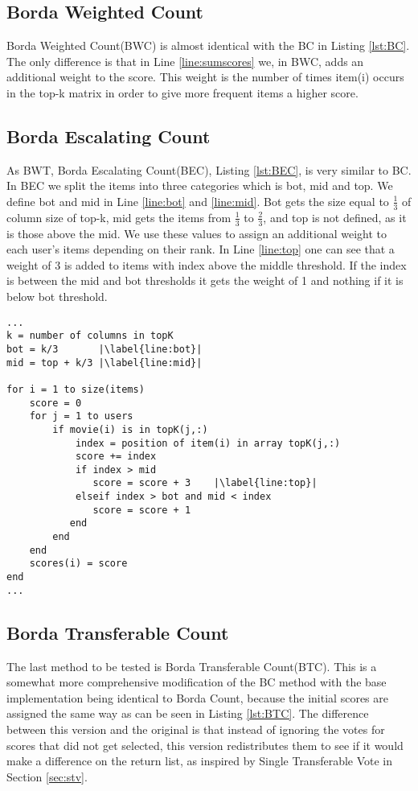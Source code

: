 \subsection{Borda Weighted Count}
Borda Weighted Count(BWC) is almost identical with the BC in Listing \ref{lst:BC}. The only difference is that in Line \ref{line:sumscores} we, in BWC, adds an additional weight to the score. This weight is the number of times item(i) occurs in the top-k matrix in order to give more frequent items a higher score.

\subsection{Borda Escalating Count}
As BWT, Borda Escalating Count(BEC), Listing \ref{lst:BEC}, is very similar to BC. In BEC we split the items into three categories which is bot, mid and top. We define bot and mid in Line \ref{line:bot} and \ref{line:mid}. Bot gets the size equal to $\frac{1}{3}$ of column size of top-k, mid gets the items from $\frac{1}{3}$ to $\frac{2}{3}$, and top is not defined, as it is those above the mid. We use these values to assign an additional weight to each user's items depending on their rank. In Line \ref{line:top} one can see that a weight of 3 is added to items with index above the middle threshold. If the index is between the mid and bot thresholds it gets the weight of 1 and nothing if it is below bot threshold.
\begin{lstlisting}[caption={Borda escalating count implementation},label=lst:BEC, firstnumber=7,escapechar=|]
...
k = number of columns in topK
bot = k/3 		|\label{line:bot}|
mid = top + k/3	|\label{line:mid}|

for i = 1 to size(items)
	score = 0
	for j = 1 to users
		if movie(i) is in topK(j,:)
			index = position of item(i) in array topK(j,:)
			score += index
			if index > mid			
               score = score + 3	|\label{line:top}|
           	elseif index > bot and mid < index
               score = score + 1
           end 
		end
	end
	scores(i) = score
end
...
\end{lstlisting}

\subsection{Borda Transferable Count} \label{sec:BTC}
The last method to be tested is Borda Transferable Count(BTC). This is a somewhat more comprehensive modification of the BC method with the base implementation being identical to Borda Count, because the initial scores are assigned the same way as can be seen in Listing \ref{lst:BTC}. The difference between this version and the original is that instead of ignoring the votes for scores that did not get selected, this version redistributes them to see if it would make a difference on the return list, as inspired by Single Transferable Vote in Section \ref{sec:stv}.

